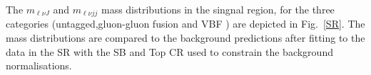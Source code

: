 \newline
The $m_{\ell \nu J}$ and $m_{\ell \nu jj}$ mass distributions in the singnal region, for the three categories (untagged,gluon-gluon fusion and VBF ) 
are depicted in Fig.~\ref{SR}. 
The mass distributions are compared to the background
predictions after fitting to the data in the SR with the SB and Top CR used to constrain the
background normalisations. 
\begin{figure}[htbp]
\centering
{}
\\                                             
\end{figure}
